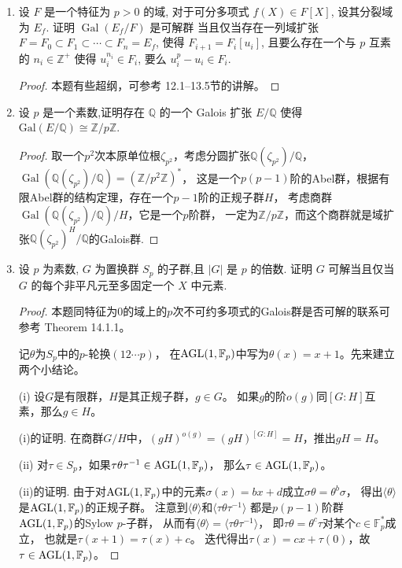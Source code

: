 \begin{enumerate}
\item 设 $ F $ 是一个特征为 $ p > 0 $ 的域, 
对于可分多项式  $ f(X) \in F[X] $, 设其分裂域为 $ E_f $.
证明 $ \operatorname{Gal}(E_f/F) $ 是可解群
当且仅当存在一列域扩张 $ F = F_0 \subset F_1 \subset \cdots \subset F_n = E_f$,
使得 $ F_{i+1} = F_i[u_i]$,
且要么存在一个与 $ p $ 互素的 $ n_i \in \mathbb{Z}^+ $ 
使得 $ u_i^{n_i} \in F_i$, 要么 $ u_i^p - u_i \in F_i$.
\begin{proof}
    本题有些超纲，可参考\cite{Ro} 12.1--13.5节的讲解。
\end{proof}
\item 设 $ p $ 是一个素数,证明存在 $ \mathbb{Q} $ 的一个 Galois 扩张 $ E/\mathbb{Q} $ 使得  
$ \text{Gal}(E/\mathbb{Q}) \cong \mathbb{Z}/p\mathbb{Z}. $
\begin{proof}
    取一个$p^2$次本原单位根$\zeta_{p^2}$，考虑分圆扩张$\mathbb{Q}(\zeta_{p^2})/\mathbb{Q}$，
    $\operatorname{Gal}(\mathbb{Q}(\zeta_{p^2})/\mathbb{Q})=(\mathbb{Z}/p^2\mathbb{Z})^*$，
    这是一个$p(p-1)$阶的Abel群，根据有限Abel群的结构定理，存在一个$p-1$阶的正规子群$H$，
    考虑商群$\operatorname{Gal}(\mathbb{Q}(\zeta_{p^2})/\mathbb{Q})/H$，它是一个$p$阶群，
    一定为$\mathbb{Z}/p\mathbb{Z}$，而这个商群就是域扩张$\mathbb{Q}(\zeta_{p^2})^H/\mathbb{Q}$的Galois群.
\end{proof}

\item 设 $ p $ 为素数, $ G $ 为置换群 $ S_p $ 的子群,且 $ |G| $ 是 $ p $ 的倍数.
证明 $ G $ 可解当且仅当 $ G $ 的每个非平凡元至多固定一个 $ X $ 中元素.
\begin{proof}
    本题同特征为$0$的域上的$p$次不可约多项式的Galois群是否可解的联系可参考\cite{Co} Theorem 14.1.1。

    记$\theta$为$S_p$中的$p$-轮换$(12 \cdots p)$，
    在${\rm AGL}(1,\mathbb{F}_p)$中写为$\theta(x)=x+1$。先来建立两个小结论。
    
    (i) 设$G$是有限群，$H$是其正规子群，$g \in G$。
    如果$g$的阶$o(g)$同$[G:H]$互素，那么$g \in H$。
    
    (i)的证明. 在商群$G/H$中，$(gH)^{o(g)}=(gH)^{[G:H]}=H$，推出$gH=H$。
    
    (ii) 对$\tau \in S_p$，如果$\tau\theta\tau^{-1}\in{\rm AGL}(1,\mathbb{F}_p)$，
    那么$\tau\in{\rm AGL}(1,\mathbb{F}_p)$。
    
    (ii)的证明. 由于对${\rm AGL}(1,\mathbb{F}_p)$中的元素$\sigma(x)=bx+d$成立$\sigma\theta=\theta^b\sigma$，
    得出$\langle\theta\rangle$是${\rm AGL}(1,\mathbb{F}_p)$的正规子群。
    注意到$\langle\theta\rangle$和$\langle\tau\theta\tau^{-1}\rangle$
    都是$p(p-1)$阶群${\rm AGL}(1,\mathbb{F}_p)$的Sylow $p$-子群，
    从而有$\langle\theta\rangle=\langle\tau\theta\tau^{-1}\rangle$，
    即$\tau\theta=\theta^c\tau$对某个$c\in\mathbb{F}_p^*$成立，
    也就是$\tau(x+1)=\tau(x)+c$。
    迭代得出$\tau(x)=cx+\tau(0)$，故$\tau\in{\rm AGL}(1,\mathbb{F}_p)$。
    

\end{proof}
\end{enumerate}
